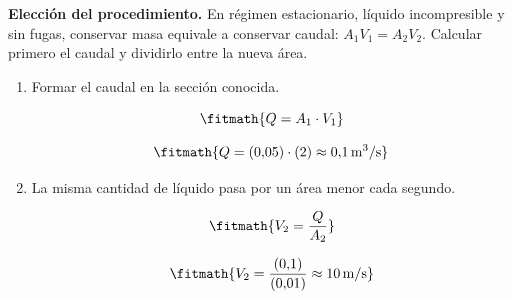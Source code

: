 \noindent\textbf{Elección del procedimiento.} En régimen estacionario, líquido incompresible y sin fugas, conservar masa equivale a conservar caudal: $A_1V_1=A_2V_2$. Calcular primero el caudal y dividirlo entre la nueva área.

\begin{enumerate}

\item Formar el caudal en la sección conocida.

\[\fitmath{Q=A_{1}\cdot V_{1}}\]

\[\fitmath{Q=(0{,}05)\cdot (2)\approx 0{,}1\,\mathrm{m^{3}/s}}\]

\item La misma cantidad de líquido pasa por un área menor cada segundo.

\[\fitmath{V_{2}=\frac{Q}{A_{2}}}\]

\[\fitmath{V_{2}=\frac{(0{,}1)}{(0{,}01)}\approx 10\,\mathrm{m/s}}\]

\end{enumerate}

